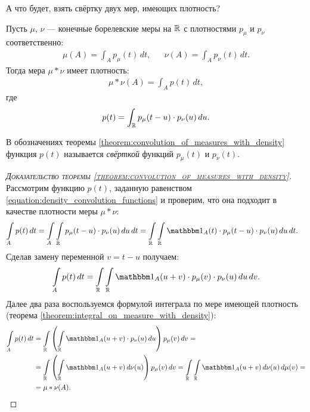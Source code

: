 \documentclass[../main.tex]{subfiles}
\begin{document}
А что будет, взять свёртку двух мер, имеющих плотность?

\begin{thm}
 \label{theorem:convolution_of_measures_with_density}
 Пусть $ \mu $, $ \nu $ --- конечные борелевские меры на $ \mathbb{R} $ с плотностями $ p_\mu $ и $ p_\nu $ соответственно:
 \begin{align*}
  \mu(A) = \int_{A} p_\mu(t)\,dt, & &\nu(A) = \int_{A} p_\nu(t)\,dt.  
 \end{align*} Тогда мера $ \mu \ast \nu $ имеет плотность:
 \begin{align*}
  \mu \ast \nu(A) = \int_{A} p(t)\,dt, 
 \end{align*} где
 \begin{align}
  \label{equation:density_convolution_functions}
  p(t) = \int_{\mathbb{R}} p_\mu(t - u) \cdot p_\nu(u)\,du.
 \end{align} 
\end{thm}
\begin{df}
 В обозначениях теоремы \ref{theorem:convolution_of_measures_with_density} функция $ p(t) $ называется \textit{свёрткой} функций $ p_\mu(t) $ и $ p_{\nu}(t) $.
\end{df}
\begin{proof}[\normalfont\textsc{Доказательство теоремы \ref{theorem:convolution_of_measures_with_density}}] Рассмотрим функцию $ p(t) $, заданную равенством \eqref{equation:density_convolution_functions} и проверим, что она подходит в качестве плотности меры $ \mu \ast \nu $:
 \begin{align*}
  \int\limits_{A} p(t)\,dt &= \int\limits_{A} \int\limits_{\R}p_\mu(t - u)\cdot p_\nu(u)\,du\,dt = \int\limits_{\R} \int\limits_{\R} \Ind_A(t) \cdot p_\mu(t-u) \cdot p_\nu(u)\,du\,dt.
 \end{align*} Сделав замену переменной $ v = t - u  $ получаем:
 \begin{align*}
  \int\limits_{A} p(t)\,dt = \int\limits_{\R}\int\limits_{\R}\Ind_A(u + v) \cdot p_\mu(v)\cdot p_\nu(u)\,du\,dv.     
 \end{align*} Далее два раза воспользуемся формулой интеграла по мере имеющей плотность (теорема \ref{theorem:integral_on_measure_with_density}):
 \begin{align*}
  \int\limits_{A} p(t)\,dt &= \int\limits_{\R} \left( \int\limits_{\R} \Ind_A(u+v) \cdot p_\nu(u)\,du  \right) p_\mu(v) \, dv = \\ &= \int\limits_{\R} \left( \int\limits_{\R} \Ind_A(u+v)\,d\nu(u)  \right) p_\mu(v)\,dv = \int\limits_{\R}  \int\limits_{\R} \Ind_A(u+v)\,d\nu(u)  \, d\mu(v) = \\
  &= \mu \ast \nu(A).
 \end{align*} 
\end{proof}
\end{document}
